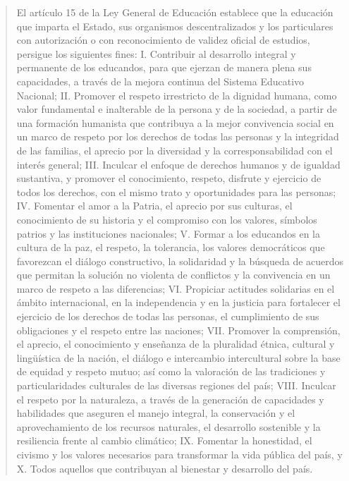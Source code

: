 \documentclass[
  12,
]{scrartcl}
\begin{document}
\begin{quote}
El artículo 15 de la Ley General de Educación establece que la educación
que imparta el Estado, sus organismos descentralizados y los
particulares con autorización o con reconocimiento de validez oficial de
estudios, persigue los siguientes fines: I. Contribuir al desarrollo
integral y permanente de los educandos, para que ejerzan de manera plena
sus capacidades, a través de la mejora continua del Sistema Educativo
Nacional; II. Promover el respeto irrestricto de la dignidad humana,
como valor fundamental e inalterable de la persona y de la sociedad, a
partir de una formación humanista que contribuya a la mejor convivencia
social en un marco de respeto por los derechos de todas las personas y
la integridad de las familias, el aprecio por la diversidad y la
corresponsabilidad con el interés general; III. Inculcar el enfoque de
derechos humanos y de igualdad sustantiva, y promover el conocimiento,
respeto, disfrute y ejercicio de todos los derechos, con el mismo trato
y oportunidades para las personas; IV. Fomentar el amor a la Patria, el
aprecio por sus culturas, el conocimiento de su historia y el compromiso
con los valores, símbolos patrios y las instituciones nacionales; V.
Formar a los educandos en la cultura de la paz, el respeto, la
tolerancia, los valores democráticos que favorezcan el diálogo
constructivo, la solidaridad y la búsqueda de acuerdos que permitan la
solución no violenta de conflictos y la convivencia en un marco de
respeto a las diferencias; VI. Propiciar actitudes solidarias en el
ámbito internacional, en la independencia y en la justicia para
fortalecer el ejercicio de los derechos de todas las personas, el
cumplimiento de sus obligaciones y el respeto entre las naciones; VII.
Promover la comprensión, el aprecio, el conocimiento y enseñanza de la
pluralidad étnica, cultural y lingüística de la nación, el diálogo e
intercambio intercultural sobre la base de equidad y respeto mutuo; así
como la valoración de las tradiciones y particularidades culturales de
las diversas regiones del país; VIII. Inculcar el respeto por la
naturaleza, a través de la generación de capacidades y habilidades que
aseguren el manejo integral, la conservación y el aprovechamiento de los
recursos naturales, el desarrollo sostenible y la resiliencia frente al
cambio climático; IX. Fomentar la honestidad, el civismo y los valores
necesarios para transformar la vida pública del país, y X. Todos
aquellos que contribuyan al bienestar y desarrollo del país.
\end{quote}
\end{document}
